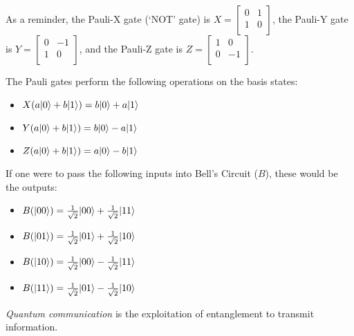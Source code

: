 
As a reminder, the Pauli-X gate (`NOT' gate) is $X = \begin{bmatrix}
    0 & 1 \\
    1 & 0\\
\end{bmatrix}$, the Pauli-Y gate is $Y = \begin{bmatrix}
    0 & -1 \\
    1 & 0\\
\end{bmatrix}$, and the Pauli-Z gate is $Z = \begin{bmatrix}
    1 & 0 \\
    0 & -1\\
\end{bmatrix}$.

The Pauli gates perform the following operations on the basis states:\\
\begin{itemize}
    \item $X(a \lvert0\rangle + b \lvert1\rangle) = b \lvert0\rangle + a \lvert1\rangle$
    \item $Y(a \lvert0\rangle + b \lvert1\rangle) = b \lvert0\rangle - a \lvert1\rangle$
    \item $Z(a \lvert0\rangle + b \lvert1\rangle) = a \lvert0\rangle - b \lvert1\rangle$
\end{itemize}

If one were to pass the following inputs into Bell's Circuit ($B$), these would be the outputs:
\begin{itemize}
    \item $B(\lvert00\rangle) = \frac{1}{\sqrt{2}} \lvert00\rangle + \frac{1}{\sqrt{2}} \lvert11\rangle$
    \item $B(\lvert01\rangle) = \frac{1}{\sqrt{2}} \lvert01\rangle + \frac{1}{\sqrt{2}} \lvert10\rangle$
    \item $B(\lvert10\rangle) = \frac{1}{\sqrt{2}} \lvert00\rangle - \frac{1}{\sqrt{2}} \lvert11\rangle$
    \item $B(\lvert11\rangle) = \frac{1}{\sqrt{2}} \lvert01\rangle - \frac{1}{\sqrt{2}} \lvert10\rangle$
\end{itemize}

\begin{definition}
    \emph{Quantum communication} is the exploitation of entanglement to transmit information.
\end{definition}
